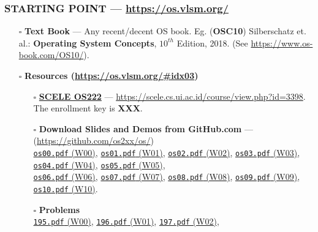 \begin{frame}[fragile]
\frametitle{\textbf{STARTING POINT} --- 
{
\hypersetup{colorlinks,linkcolor=,urlcolor=links}
\url{https://os.vlsm.org/}
}
}
\begin{itemize}
\item[$\square$] \textbf{Text Book} ---
                 Any recent/decent OS book. Eg. (\textbf{OSC10}) Silberschatz et. al.: 
                 \textbf{Operating System Concepts}, $10^{th}$ Edition, 2018.
                 (See \url{https://www.os-book.com/OS10/}).
\item[$\square$] \textbf{Resources ({\footnotesize \url{https://os.vlsm.org/\#idx03}})}
\begin{itemize}
\item[$\square$] \href{https://scele.cs.ui.ac.id/course/view.php?id=3398}{\textbf{SCELE OS222}} ---
\url{https://scele.cs.ui.ac.id/course/view.php?id=3398}.\\
The enrollment key is \textbf{XXX}.
\item[$\square$] \textbf{Download Slides and Demos from GitHub.com} --- (\url{https://github.com/os2xx/os/})\\
                 {\scriptsize%
                 \href{https://os.vlsm.org/Slides/os00.pdf}{\texttt{os00.pdf} (W00)},
                 \href{https://os.vlsm.org/Slides/os01.pdf}{\texttt{os01.pdf} (W01)},
                 \href{https://os.vlsm.org/Slides/os02.pdf}{\texttt{os02.pdf} (W02)},
                 \href{https://os.vlsm.org/Slides/os03.pdf}{\texttt{os03.pdf} (W03)},
                 \href{https://os.vlsm.org/Slides/os04.pdf}{\texttt{os04.pdf} (W04)},
                 \href{https://os.vlsm.org/Slides/os05.pdf}{\texttt{os05.pdf} (W05)},\\
                 \href{https://os.vlsm.org/Slides/os06.pdf}{\texttt{os06.pdf} (W06)},
                 \href{https://os.vlsm.org/Slides/os07.pdf}{\texttt{os07.pdf} (W07)},
                 \href{https://os.vlsm.org/Slides/os08.pdf}{\texttt{os08.pdf} (W08)},
                 \href{https://os.vlsm.org/Slides/os09.pdf}{\texttt{os09.pdf} (W09)},
                 \href{https://os.vlsm.org/Slides/os10.pdf}{\texttt{os10.pdf} (W10)}.
                 }
\item[$\square$] \textbf{Problems}\\
                 {\scriptsize%
                 \href{https://rms46.vlsm.org/2/195.pdf}{\texttt{195.pdf} (W00)},
                 \href{https://rms46.vlsm.org/2/196.pdf}{\texttt{196.pdf} (W01)},
                 \href{https://rms46.vlsm.org/2/197.pdf}{\texttt{197.pdf} (W02)},
}
\end{itemize}
\end{itemize}
\end{frame}
